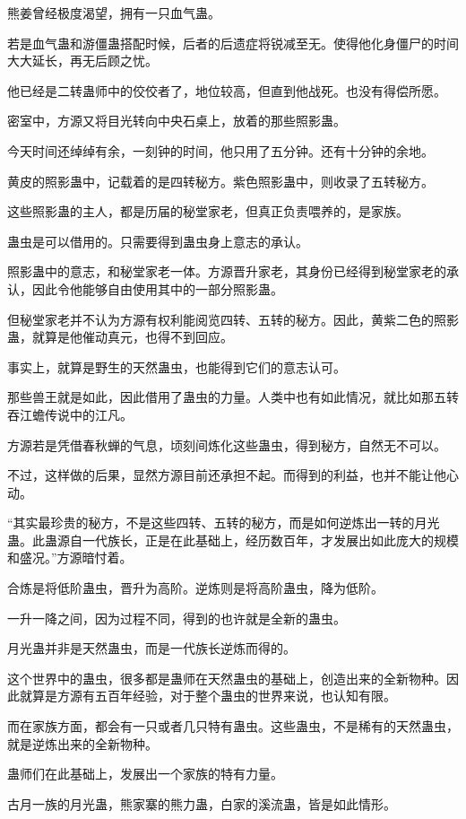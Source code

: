 \begin{this_body}
熊姜曾经极度渴望，拥有一只血气蛊。

若是血气蛊和游僵蛊搭配时候，后者的后遗症将锐减至无。使得他化身僵尸的时间大大延长，再无后顾之忧。

他已经是二转蛊师中的佼佼者了，地位较高，但直到他战死。也没有得偿所愿。

密室中，方源又将目光转向中央石桌上，放着的那些照影蛊。

今天时间还绰绰有余，一刻钟的时间，他只用了五分钟。还有十分钟的余地。

黄皮的照影蛊中，记载着的是四转秘方。紫色照影蛊中，则收录了五转秘方。

这些照影蛊的主人，都是历届的秘堂家老，但真正负责喂养的，是家族。

蛊虫是可以借用的。只需要得到蛊虫身上意志的承认。

照影蛊中的意志，和秘堂家老一体。方源晋升家老，其身份已经得到秘堂家老的承认，因此令他能够自由使用其中的一部分照影蛊。

但秘堂家老并不认为方源有权利能阅览四转、五转的秘方。因此，黄紫二色的照影蛊，就算是他催动真元，也得不到回应。

事实上，就算是野生的天然蛊虫，也能得到它们的意志认可。

那些兽王就是如此，因此借用了蛊虫的力量。人类中也有如此情况，就比如那五转吞江蟾传说中的江凡。

方源若是凭借春秋蝉的气息，顷刻间炼化这些蛊虫，得到秘方，自然无不可以。

不过，这样做的后果，显然方源目前还承担不起。而得到的利益，也并不能让他心动。

“其实最珍贵的秘方，不是这些四转、五转的秘方，而是如何逆炼出一转的月光蛊。此蛊源自一代族长，正是在此基础上，经历数百年，才发展出如此庞大的规模和盛况。”方源暗忖着。

合炼是将低阶蛊虫，晋升为高阶。逆炼则是将高阶蛊虫，降为低阶。

一升一降之间，因为过程不同，得到的也许就是全新的蛊虫。

月光蛊并非是天然蛊虫，而是一代族长逆炼而得的。

这个世界中的蛊虫，很多都是蛊师在天然蛊虫的基础上，创造出来的全新物种。因此就算是方源有五百年经验，对于整个蛊虫的世界来说，也认知有限。

而在家族方面，都会有一只或者几只特有蛊虫。这些蛊虫，不是稀有的天然蛊虫，就是逆炼出来的全新物种。

蛊师们在此基础上，发展出一个家族的特有力量。

古月一族的月光蛊，熊家寨的熊力蛊，白家的溪流蛊，皆是如此情形。


\end{this_body}
